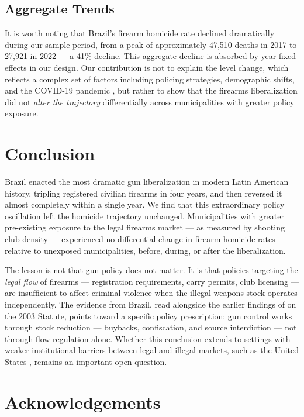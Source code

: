\documentclass[12pt]{article}
\begin{document}
\subsection{Aggregate Trends}

It is worth noting that Brazil's firearm homicide rate declined dramatically during our sample period, from a peak of approximately 47,510 deaths in 2017 to 27,921 in 2022 --- a 41\% decline. This aggregate decline is absorbed by year fixed effects in our design. Our contribution is not to explain the level change, which reflects a complex set of factors including policing strategies, demographic shifts, and the COVID-19 pandemic \citep{levitt2004crime, deangelo2017life}, but rather to show that the firearms liberalization did not \textit{alter the trajectory} differentially across municipalities with greater policy exposure.


\section{Conclusion}
\label{sec:conclusion}

Brazil enacted the most dramatic gun liberalization in modern Latin American history, tripling registered civilian firearms in four years, and then reversed it almost completely within a single year. We find that this extraordinary policy oscillation left the homicide trajectory unchanged. Municipalities with greater pre-existing exposure to the legal firearms market --- as measured by shooting club density --- experienced no differential change in firearm homicide rates relative to unexposed municipalities, before, during, or after the liberalization.

The lesson is not that gun policy does not matter. It is that policies targeting the \textit{legal flow} of firearms --- registration requirements, carry permits, club licensing --- are insufficient to affect criminal violence when the illegal weapons stock operates independently. The evidence from Brazil, read alongside the earlier findings of \citet{cerqueiramello2013} on the 2003 Statute, points toward a specific policy prescription: gun control works through stock reduction --- buybacks, confiscation, and source interdiction --- not through flow regulation alone. Whether this conclusion extends to settings with weaker institutional barriers between legal and illegal markets, such as the United States \citep{mustard2001right, donohue2022whyrtc}, remains an important open question.


\section*{Acknowledgements}
\end{document}
